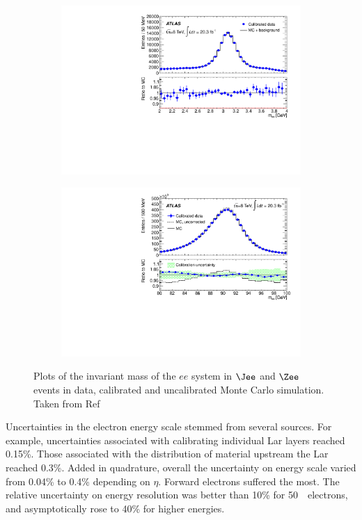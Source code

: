 \begin{figure}[h]
\begin{subfigure}{0.5\textwidth}
   \includegraphics[width=\textwidth]{figures/JPsiPlot.pdf}
	\caption{\Jee}
\end{subfigure} %
\begin{subfigure}{0.5\textwidth}
   \includegraphics[width=\textwidth]{figures/LineShapePlot_NotZoomed_ForPaper_v3.pdf}
	\caption{\Zee}
\end{subfigure}
\caption{Plots of the invariant mass of the $ee$ system in $\Jee$ and $\Zee$ events in data, calibrated and uncalibrated 
 Monte Carlo simulation. Taken from Ref~\cite{Aad:2014nim}}
\label{fig:calibVal}
\end{figure}

\par Uncertainties in the electron energy scale stemmed from several sources. For example, uncertainties associated 
with calibrating individual Lar layers reached 0.15\%. Those associated with the distribution of material upstream
 the Lar reached 0.3\%. Added in quadrature, overall the uncertainty on energy scale varied from 0.04\% to 0.4\% depending 
on $\eta$. Forward electrons suffered the most. The relative uncertainty on energy resolution was better than 10\% for 
50~\GeV\ electrons, and asymptotically rose to 40\% for higher energies.   
